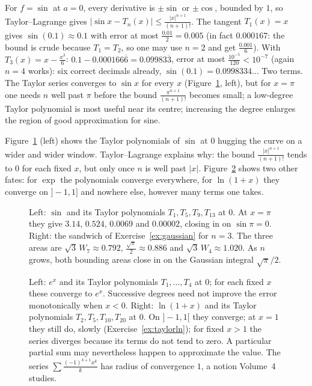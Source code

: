 \begin{examplex}
For $f=\sin$ at $a=0$, every derivative is $\pm\sin$ or $\pm\cos$, bounded by $1$, so Taylor--Lagrange gives $|\sin x-T_n(x)|\le\frac{|x|^{n+1}}{(n+1)!}$. The tangent $T_1(x)=x$ gives
$\sin(0.1)\approx0.1$ with error at most $\frac{0.01}2=0.005$ (in fact $0.000167$: the bound is crude because $T_1=T_2$, so one may use $n=2$ and get $\frac{0.001}6$). With $T_3(x)=x-\frac{x^3}6$: $0.1-0.000166\overline6=0.09983\overline3$, error at most $\frac{10^{-5}}{120}<10^{-7}$ (again $n=4$ works): six correct decimals already, $\sin(0.1)=0.0998334\ldots$ Two terms. The Taylor series converges to $\sin x$ for every $x$ (Figure~\ref{fig:taylor}, left), but for $x=\pi$ one needs $n$ well past $\pi$ before the bound $\frac{\pi^{n+1}}{(n+1)!}$ becomes small; a low-degree Taylor polynomial is most useful near its centre; increasing the degree enlarges the region of good approximation for sine.
\end{examplex}

Figure~\ref{fig:taylor} (left) shows the Taylor polynomials of $\sin$ at $0$ hugging the curve on a wider and wider window. Taylor--Lagrange explains why: the bound $\frac{|x|^{n+1}}{(n+1)!}$ tends to $0$ for each fixed $x$, but only once $n$ is well past $|x|$. Figure~\ref{fig:taylorexp} shows two other fates: for $\exp$ the polynomials converge everywhere, for $\ln(1+x)$ they converge on $]-1,1]$ and nowhere else, however many terms one takes.

\begin{figure}[ht]
\centering
{}
\caption{Left: $\sin$ and its Taylor polynomials $T_1,T_5,T_9,T_{13}$ at $0$. At $x=\pi$ they give $3.14$, $0.524$, $0.0069$ and $0.00002$, closing in on $\sin\pi=0$. Right: the sandwich of Exercise~\ref{ex:gaussian} for $n=3$. The three areas are $\sqrt3\,W_7\approx0.792$, $\frac{\sqrt\pi}2\approx0.886$ and $\sqrt3\,W_4\approx1.020$. As $n$ grows, both bounding areas close in on the Gaussian integral $\sqrt\pi/2$.}
\label{fig:taylor}
\end{figure}

\begin{figure}[ht]
\centering
{}
\caption{Left: $e^x$ and its Taylor polynomials $T_1,\dots,T_4$ at $0$; for each fixed $x$ these converge to $e^x$. Successive degrees need not improve the error monotonically when $x<0$. Right: $\ln(1+x)$ and its Taylor polynomials $T_2,T_5,T_{10},T_{20}$ at $0$. On $]-1,1[$ they converge; at $x=1$ they still do, slowly (Exercise~\ref{ex:taylorln}); for fixed $x>1$ the series diverges because its terms do not tend to zero. A particular partial sum may nevertheless happen to approximate the value. The series $\sum\frac{(-1)^{k+1}x^k}k$ has radius of convergence $1$, a notion Volume~4 studies.}
\label{fig:taylorexp}
\end{figure}

